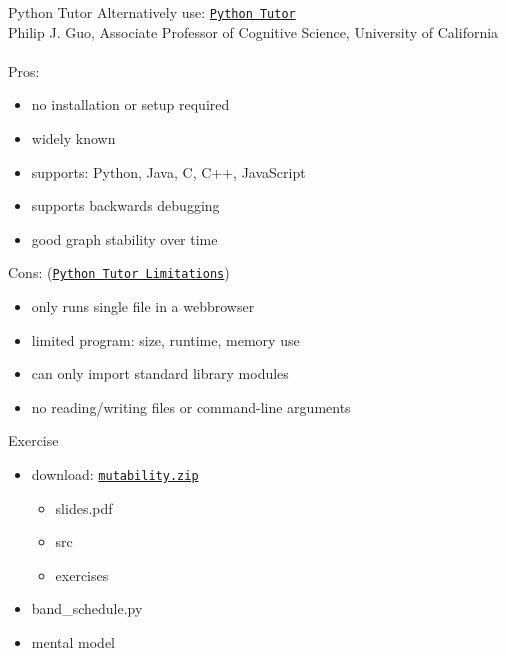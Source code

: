 \documentclass[10pt, colorlinks=true, urlcolor=blue]{beamer}
\begin{document}
\begin{frame}{Python Tutor}
  Alternatively use: \href{https://pythontutor.com/}{\texttt{Python Tutor}}\\
  Philip J. Guo, Associate Professor of Cognitive Science, University of California\\
  \vspace{1em}\\
  Pros:
  \begin{itemize}
  \item no installation or setup required
  \item widely known
  \item supports: Python, Java, C, C++, JavaScript
  \item supports backwards debugging
  \item good graph stability over time
  \end{itemize}
  Cons: (\href{https://docs.google.com/document/d/13_Bc-l2FKMgwPx4dZb0sv7eMfYMHhRVgBRShha8kgbU/}{\texttt{Python Tutor Limitations}})
  \begin{itemize}
  \item only runs single file in a webbrowser
  \item limited program: size, runtime, memory use
  \item can only import standard library modules
  \item no reading/writing files or command-line arguments
  \end{itemize}
\end{frame}

\begin{frame}{Exercise}
  \begin{itemize}
  \item download: \href{https://raw.githubusercontent.com/bterwijn/memory_graph_videos/refs/heads/main/mutability/mutability.zip}{\texttt{mutability.zip}}
    \begin{itemize}
    \item slides.pdf
    \item src
    \item exercises
    \end{itemize}
  \item band\_schedule.py
  \item mental model
  \end{itemize}
\end{frame}
\end{document}
